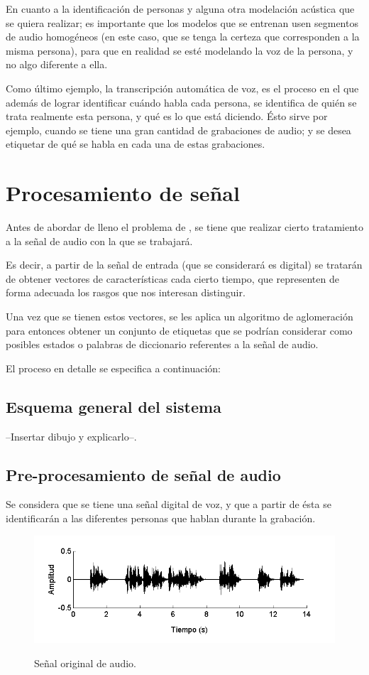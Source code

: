 En cuanto a la identificación de personas y alguna otra modelación acústica que se quiera realizar; es importante que los modelos que se entrenan usen segmentos de audio homogéneos (en este caso, que se tenga la certeza que corresponden a la misma persona), para que en realidad se esté modelando la voz de la persona, y no algo diferente a ella.

Como último ejemplo, la transcripción automática de voz, es el proceso en el que además de lograr identificar cuándo habla cada persona, se identifica de quién se trata realmente esta persona, y qué es lo que está diciendo. Ésto sirve por ejemplo, cuando se tiene una gran cantidad de grabaciones de audio; y se desea etiquetar de qué se habla en cada una de estas grabaciones. 

\section{Procesamiento de señal}

Antes de abordar de lleno el problema de \sd, se tiene que realizar cierto tratamiento a la señal de audio con la que se trabajará. 

Es decir, a partir de la señal de entrada (que se considerará es digital) se tratarán de obtener vectores de características cada cierto tiempo, que representen de forma adecuada los rasgos que nos interesan distinguir.

Una vez que se tienen estos vectores, se les aplica un algoritmo de aglomeración para entonces obtener un conjunto de etiquetas que se podrían considerar como posibles estados o palabras de diccionario referentes a la señal de audio.

El proceso en detalle se especifica a continuación: 
\subsection{Esquema general del sistema}

--Insertar dibujo y explicarlo--.

\subsection{Pre-procesamiento de señal de audio}

Se considera que se tiene una señal digital de voz, y que a partir de ésta se identificarán a las diferentes personas que hablan durante la grabación.

\begin{figure}[bth]
  \myfloatalign
  {\includegraphics[width=0.9\linewidth]{gfx/chap5/signal-orig}} \quad
  \caption{Señal original de audio.}
  \label{fig:sign_orig}
\end{figure}

